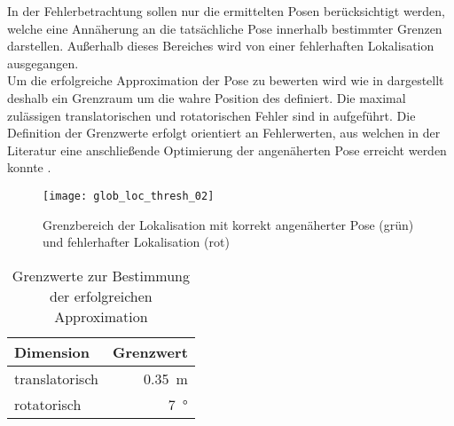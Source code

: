 

In der Fehlerbetrachtung sollen nur die ermittelten Posen berücksichtigt werden, welche eine Annäherung an die tatsächliche Pose innerhalb bestimmter Grenzen darstellen. Außerhalb dieses Bereiches wird von einer fehlerhaften Lokalisation ausgegangen.\\
Um die erfolgreiche Approximation der Pose zu bewerten wird wie in  dargestellt deshalb ein Grenzraum um die wahre Position des  definiert. Die maximal zulässigen translatorischen und rotatorischen Fehler sind in  aufgeführt. Die Definition der Grenzwerte erfolgt orientiert an Fehlerwerten, aus welchen in der Literatur eine anschließende Optimierung der angenäherten Pose erreicht werden konnte \cite{Forster2013}.\\

\begin{figure}[!ht]
	\begin{center}
		\texttt{[image: glob\_loc\_thresh\_02]}
		\caption{Grenzbereich der Lokalisation mit korrekt angenäherter Pose (grün) und fehlerhafter Lokalisation (rot)}
		\label{fig.loclimits}
	\end{center}
\end{figure}

\begin{table}[ht]
	\centering
	\caption{Grenzwerte zur Bestimmung der erfolgreichen Approximation}
	\label{tab.thresh_glob}
	\vspace*{-3mm}
	\begin{tabular}[ht]{|l|r|}\hline
		\rowcolor{Snow2}
		Dimension		& Grenzwert 					\\ \hline
		translatorisch  	& \SI{0,35}{\meter}			\\ \hline
		rotatorisch		& \SI{7}{°}					\\ \hline
	\end{tabular} 
\end{table}

